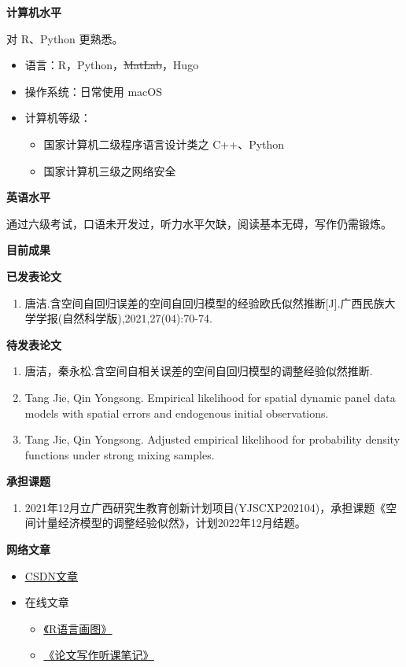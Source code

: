 \documentclass[UFT8]{ctexart}
\def\bi{\begin{itemize}}
\def\ei{\end{itemize}}
\def\be{ \begin{enumerate}}
\def\ee{ \end{enumerate}}
\begin{document}
\bigskip
\begin{center}
{ \bf \kaishu \large     计算机水平}
\end{center}

对 R、Python 更熟悉。
\bi
\item 语言：R，Python，\sout{MatLab}，Hugo
\item 操作系统：日常使用 macOS
\item 计算机等级：
  \bi
   \item 国家计算机二级程序语言设计类之 C++、Python
   \item 国家计算机三级之网络安全
   \ei
\ei

\bigskip
\begin{center}
{ \bf \kaishu \large    英语水平}
\end{center}

通过六级考试，口语未开发过，听力水平欠缺，阅读基本无碍，写作仍需锻炼。

\bigskip
\begin{center}
{ \bf \kaishu \large      目前成果}
\end{center}

{\center \bf \kaishu     已发表论文}
\smallskip

\be
\item 唐洁.含空间自回归误差的空间自回归模型的经验欧氏似然推断[J].广西民族大学学报(自然科学版),2021,27(04):70-74. 
\ee

{\center \bf \kaishu      待发表论文}
\smallskip

\be
\item 唐洁，秦永松.含空间自相关误差的空间自回归模型的调整经验似然推断.
\item Tang Jie, Qin Yongsong. Empirical likelihood for spatial dynamic panel data models with spatial errors and endogenous initial observations.
\item Tang Jie, Qin Yongsong. Adjusted empirical likelihood for probability density functions under strong mixing samples.
\ee

{\center \bf \kaishu       承担课题}

\be
\item 2021年12月立广西研究生教育创新计划项目(YJSCXP202104)，承担课题《空间计量经济模型的调整经验似然》，计划2022年12月结题。
\ee

 {\center \bf \kaishu      网络文章}
 
 \bi
\item \href{https://blog.csdn.net/JTang1995?type=lately}{\uline{CSDN文章}} 
\item 在线文章 
   \bi
   \item \href{https://tang-jay.github.io/RBook}{\uline{《R语言画图》}} 
   \item \href{https://tang-jay.github.io/EssayNotes}{\uline{《论文写作听课笔记》}} 
   \ei
\ei
\end{document}
